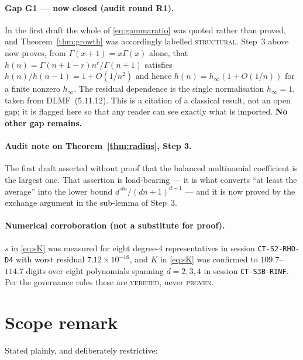 \documentclass[11pt]{article}
\theoremstyle{definition}
\begin{document}
\paragraph{Gap G1 --- now closed (audit round R1).} In the first draft the whole
of \eqref{eq:gammaratio} was quoted rather than proved, and
Theorem~\ref{thm:growth} was accordingly labelled \textsc{structural}. Step~3
above now proves, from $\Gamma(x+1)=x\Gamma(x)$ alone, that
$h(n)=\Gamma(n+1-r)n^{r}/\Gamma(n+1)$ satisfies $h(n)/h(n-1)=1+O(1/n^{2})$ and
hence $h(n)=h_\infty(1+O(1/n))$ for a finite nonzero $h_\infty$. The residual
dependence is the single normalisation $h_\infty=1$, taken from
DLMF~(5.11.12). This is a citation of a classical result, not an
open gap; it is flagged here so that any reader can see exactly what is
imported. \textbf{No other gap remains.}

\paragraph{Audit note on Theorem~\ref{thm:radius}, Step 3.} The first draft
asserted without proof that the balanced multinomial coefficient is the largest
one. That assertion is load-bearing --- it is what converts ``at least the
average'' into the lower bound $d^{\,dn}/(dn+1)^{d-1}$ --- and it is now proved
by the exchange argument in the sub-lemma of Step~3.

\paragraph{Numerical corroboration (not a substitute for proof).}
$s$ in \eqref{eq:sK} was measured for eight degree-$4$ representatives in session
\texttt{CT-S2-RHO-D4} with worst residual $7.12\times10^{-16}$, and $K$ in
\eqref{eq:sK} was confirmed to $109.7$--$114.7$ digits over eight polynomials
spanning $d=2,3,4$ in session \texttt{CT-S3B-RINF}. Per the governance rules
these are \textsc{verified}, never \textsc{proven}.

\section{Scope remark}

Stated plainly, and deliberately restrictive:
\end{document}
